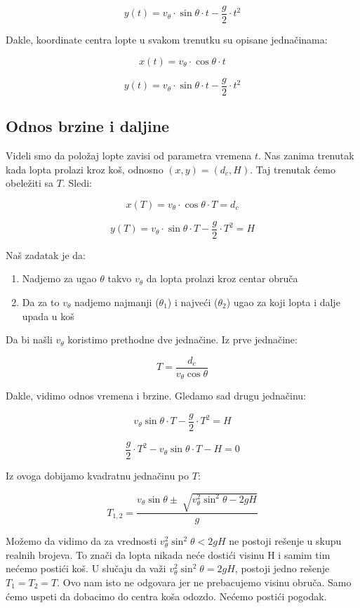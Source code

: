\documentclass[a4paper, 12pt]{article}
\begin{document}
\[y(t) = v_{\theta} \cdot \sin \theta\cdot t - \dfrac{g}{2} \cdot t^2\]

Dakle, koordinate centra lopte u svakom trenutku su opisane jednačinama:

\[x(t) = v_\theta \cdot \cos \theta \cdot t\]

\[y(t) = v_{\theta} \cdot \sin \theta \cdot t - \dfrac{g}{2} \cdot t^2\]

\subsection{Odnos brzine i daljine} %

Videli smo da položaj lopte zavisi od parametra vremena $t$. Nas zanima trenutak kada lopta prolazi kroz koš, odnosno $(x,y) = (d_c,H)$. Taj trenutak ćemo obeležiti sa $T$. Sledi:

\[x(T) = v_\theta \cdot \cos \theta \cdot T = d_c\]

\[y(T) = v_{\theta} \cdot \sin \theta \cdot T - \dfrac{g}{2} \cdot T^2 = H\]

\pagebreak

Naš zadatak je da:

\begin{enumerate}
\item Nadjemo za ugao $\theta$ takvo $v_{\theta}$ da lopta prolazi kroz centar obruča
\item Da za to $v_{\theta}$ nadjemo najmanji ($\theta_1$) i najveći ($\theta_2$) ugao za koji lopta i dalje upada u koš
\end{enumerate}

Da bi našli $v_{\theta}$ koristimo prethodne dve jednačine. Iz prve jednačine:

\[T = \dfrac{d_c}{v_\theta \cos \theta} \]

Dakle, vidimo odnos vremena i brzine. Gledamo sad drugu jednačinu:

\[v_{\theta} \sin \theta \cdot T - \dfrac{g}{2} \cdot T^2 = H\]

\[\dfrac{g}{2} \cdot T^2 - v_{\theta} \sin \theta \cdot T - H = 0\]

Iz ovoga dobijamo kvadratnu jednačinu po $T$:

\[T_{1,2} = \dfrac{v_{\theta} \sin \theta \pm \sqrt[]{v_{\theta}^2 \sin^2 \theta - 2 g H}}{g}\]

Možemo da vidimo da za vrednosti ${v_{\theta}^2 \sin^2 \theta < 2 g H}$ ne postoji rešenje u skupu realnih brojeva. To znači da lopta nikada neće dostići visinu H i samim tim nećemo postići koš.
U slučaju da važi ${v_{\theta}^2 \sin^2 \theta = 2 g H}$, postoji jedno rešenje $T_1 = T_2 = T$. Ovo nam isto ne odgovara jer ne prebacujemo visinu obruča. Samo ćemo uspeti da dobacimo do centra koša odozdo. Nećemo postići pogodak.
\end{document}
